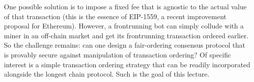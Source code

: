 \documentclass{article}
\begin{document}
One possible solution is to impose a fixed  fee that is agnostic to the actual value of that transaction (this is the essence of EIP-1559, a recent improvement proposal for {\sf Ethereum}). However, a   frontrunning bot can simply collude with a miner in an off-chain market and get its frontrunning transaction ordered earlier. So the challenge remains: can one design a fair-ordering consensus protocol  that is provably secure  against manipulation of transaction ordering? Of specific interest is a simple transaction ordering strategy  that can be readily incorporated alongside  the longest chain protocol. Such is the goal of this lecture. 

 





\end{document}
